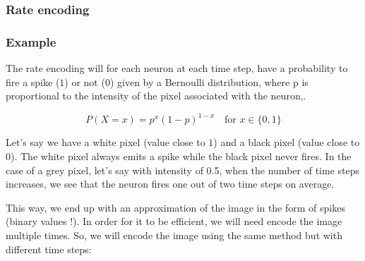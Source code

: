 \documentclass[11pt]{article}
\begin{document}
\subsubsection{Rate encoding}

\subsubsection*{Example}

The rate encoding will for each neuron at each time step, have a probability to fire a spike ($1$) or not ($0$) given by a Bernoulli distribution, where p is proportional to the intensity of the pixel associated with the neuron,.


$$P(X = x) = p^x (1 - p)^{1-x} \quad \text{for } x \in \{0, 1\}$$



Let's say we have a white pixel (value close to $1$) and a black pixel (value close to $0$). The white pixel always emits a spike while the black pixel never fires. In the case of a grey pixel, let's say with intensity of 0.5, when the number of time steps increases, we see that the neuron fires one out of two time steps on average.

This way, we end up with an approximation of the image in the form of spikes (binary values !). In order for it to be efficient, we will need encode the image multiple times. So, we will encode the image using the same method but with different time steps:
\end{document}
